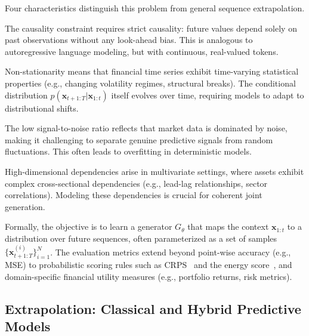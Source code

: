 \documentclass[11pt,a4paper]{article}
\begin{document}
Four characteristics distinguish this problem from general sequence extrapolation.

The causality constraint requires strict causality: future values depend solely on past observations without any look-ahead bias. This is analogous to autoregressive language modeling, but with continuous, real-valued tokens.

Non-stationarity means that financial time series exhibit time-varying statistical properties (e.g., changing volatility regimes, structural breaks). The conditional distribution $p(\mathbf{x}_{t+1:T} | \mathbf{x}_{1:t})$ itself evolves over time, requiring models to adapt to distributional shifts.

The low signal-to-noise ratio reflects that market data is dominated by noise, making it challenging to separate genuine predictive signals from random fluctuations. This often leads to overfitting in deterministic models.

High-dimensional dependencies arise in multivariate settings, where assets exhibit complex cross-sectional dependencies (e.g., lead-lag relationships, sector correlations). Modeling these dependencies is crucial for coherent joint generation.

Formally, the objective is to learn a generator $G_\theta$ that maps the context $\mathbf{x}_{1:t}$ to a distribution over future sequences, often parameterized as a set of samples $\{\mathbf{x}_{t+1:T}^{(i)}\}_{i=1}^N$. The evaluation metrics extend beyond point-wise accuracy (e.g., MSE) to probabilistic scoring rules such as CRPS~\citep{gneiting2007strictly} and the energy score~\citep{gneiting2008assessing}, and domain-specific financial utility measures (e.g., portfolio returns, risk metrics).

\subsection{Extrapolation: Classical and Hybrid Predictive Models}
\end{document}
